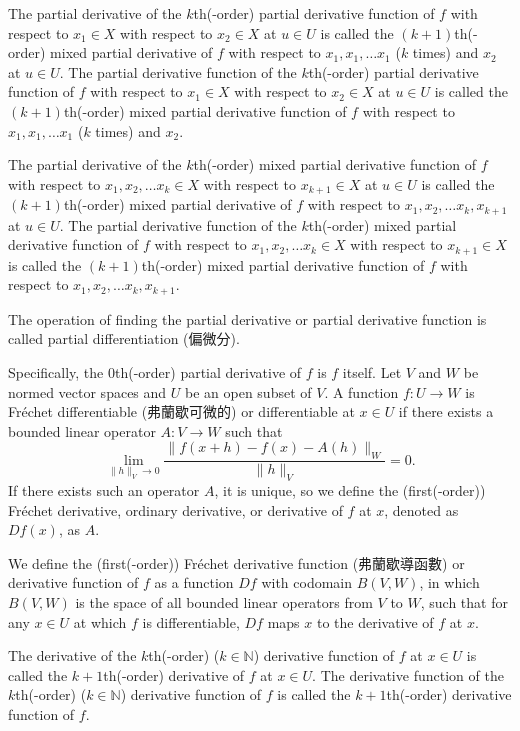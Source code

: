 \documentclass[a4paper,12pt]{report}
\begin{document}
The partial derivative of the $k$th(-order) partial derivative function of $f$ with respect to $ x_1\in X$ with respect to $ x_2\in X$ at $u\in U$ is called the $(k+1)$th(-order) mixed partial derivative of $f$ with respect to $ x_1, x_1,\ldots x_1$ ($k$ times) and $ x_2$ at $u\in U$. The partial derivative function of the $k$th(-order) partial derivative function of $f$ with respect to $ x_1\in X$ with respect to $ x_2\in X$ at $u\in U$ is called the $(k+1)$th(-order) mixed partial derivative function of $f$ with respect to $ x_1, x_1,\ldots x_1$ ($k$ times) and $ x_2$.

The partial derivative of the $k$th(-order) mixed partial derivative function of $f$ with respect to $ x_1, x_2,\ldots x_k\in X$ with respect to $ x_{k+1}\in X$ at $u\in U$ is called the $(k+1)$th(-order) mixed partial derivative of $f$ with respect to $ x_1, x_2,\ldots x_k, x_{k+1}$ at $u\in U$. The partial derivative function of the $k$th(-order) mixed partial derivative function of $f$ with respect to $ x_1, x_2,\ldots x_k\in X$ with respect to $ x_{k+1}\in X$ is called the $(k+1)$th(-order) mixed partial derivative function of $f$ with respect to $ x_1, x_2,\ldots x_k, x_{k+1}$.

The operation of finding the partial derivative or partial derivative function is called partial differentiation (偏微分).

Specifically, the $0$th(-order) partial derivative of $f$ is $f$ itself.
Let $V$ and $W$ be normed vector spaces and $U$ be an open subset of $V$. A function $f\colon U\to W$ is Fréchet differentiable (弗蘭歇可微的) or differentiable at $x\in U$ if there exists a bounded linear operator $A\colon V\to W$ such that
\[\lim_{\|h\|_V\to 0}\frac{\|f(x+h)-f(x)-A(h)\|_W}{\|h\|_V}=0.\]
If there exists such an operator $A$, it is unique, so we define the (first(-order)) Fréchet derivative, ordinary derivative, or derivative of $f$ at $x$, denoted as $Df(x)$, as $A$.

We define the (first(-order)) Fréchet derivative function (弗蘭歇導函數) or derivative function of $f$ as a function $Df$ with codomain $B(V,W)$, in which $B(V,W)$ is the space of all bounded linear operators from $V$ to $W$, such that for any $x\in U$ at which $f$ is differentiable, $Df$ maps $x$ to the derivative of $f$ at $x$.

The derivative of the $k$th(-order) ($k\in\mathbb{N}$) derivative function of $f$ at $x\in U$ is called the $k+1$th(-order) derivative of $f$ at $x\in U$. The derivative function of the $k$th(-order) ($k\in\mathbb{N}$) derivative function of $f$ is called the $k+1$th(-order) derivative function of $f$.
\end{document}
